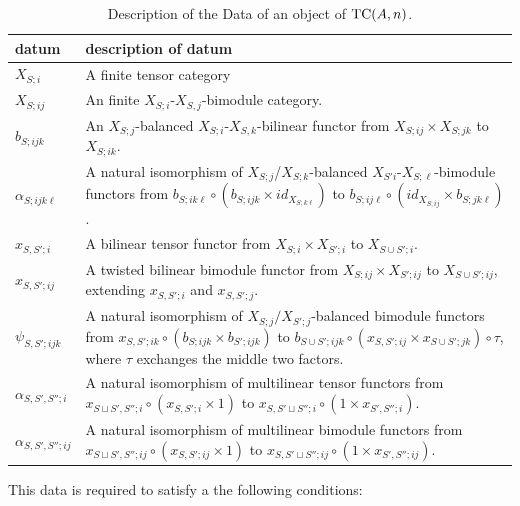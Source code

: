\documentclass{amsart}
\begin{document}
\begin{table}[ht]
	\caption{Description of the Data of an object of $\mathrm{TC}(A,n)$.}	
	\begin{tabular}{l p{11cm}}
		datum & description of datum \\ \hline
		$X_{S;i}$ & A finite tensor category \\
		$X_{S;ij}$ & An finite $X_{S;i}$-$X_{S,j}$-bimodule category. \\
		$b_{S; ijk}$ & An $X_{S;j}$-balanced $X_{S;i}$-$X_{S,k}$-bilinear functor from $X_{S;ij}\times X_{S;jk}$ to $X_{S;ik}$. \\
		$\alpha_{S;ijk \ell}$  & A natural isomorphism of $X_{S;j}$/$X_{S;k}$-balanced $X_{S'i}$-$X_{S;\ell}$-bimodule functors from $b_{S;i k \ell} \circ (b_{S;ijk} \times id_{X_{S;k\ell}})$ to $b_{S;ij \ell} \circ (id_{X_{S;ij}} \times b_{S;jk\ell})$. \\ \hline
		$x_{S, S';i}$ & A bilinear tensor functor from $X_{S;i} \times X_{S';i}$ to $X_{S \cup S'; i}$. \\
		$x_{S, S';ij}$ & A twisted bilinear bimodule functor from $X_{S;ij} \times X_{S';ij}$ to $X_{S \cup S'; ij}$, extending $x_{S, S';i}$ and $x_{S, S';j}$. \\
		$\psi_{S, S'; i j k}$ & A natural isomorphism of $X_{S;j} / X_{S';j}$-balanced bimodule functors from $x_{S,S'; ik} \circ (b_{S; ijk} \times b_{S';ijk})$ to $b_{S \cup S'; ijk} \circ (x_{S,S';ij} \times x_{S \cup S'; jk}) \circ  \tau $, where $\tau$ exchanges the middle two factors.  \\ \hline
		$\alpha_{S, S', S'';i}$ & A natural isomorphism of multilinear tensor functors from
		$x_{S \sqcup S', S'';i}\circ (x_{S,S';i} \times 1)$  to 
		$x_{S, S' \sqcup S'';i} \circ (1 \times x_{S', S'';i})$. \\
		$\alpha_{S, S', S'';ij}$ & A natural isomorphism of multilinear bimodule functors from
		$x_{S \sqcup S', S'';ij}\circ (x_{S,S';ij} \times 1)$  to 
		$x_{S, S' \sqcup S'';ij} \circ (1 \times x_{S', S'';ij})$. \\
	\end{tabular}
	\label{Table:ObjectOfTC2}
\end{table}
This data is required to satisfy a the following conditions: \\
\end{document}
